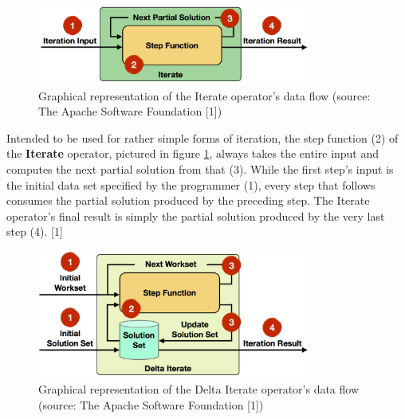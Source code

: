 
\begin{figure}[h]
	\centering
	\includegraphics[width=0.8\textwidth]{images/iterations_iterate_operator}
    \caption{Graphical representation of the Iterate operator's data flow
        (source: The Apache Software Foundation [1])}
	\label{fig:iterate_operator}
\end{figure}

Intended to be used for rather simple forms of iteration, the step function (2)
of the \textbf{Iterate} operator, pictured in figure
\ref{fig:iterate_operator}, always takes the entire input and computes the next
partial solution from that (3). While the first step's input is the initial
data set specified by the programmer (1), every step that follows consumes the
partial solution produced by the preceding step. The Iterate operator's final
result is simply the partial solution produced by the very last step (4). [1]


\begin{figure}[h]
	\centering
    \includegraphics[width=0.8\textwidth]
        {images/iterations_delta_iterate_operator}
    \caption{Graphical representation of the Delta Iterate operator's data flow
        (source: The Apache Software Foundation [1])}
	\label{fig:delta_iterate_operator}
\end{figure}

